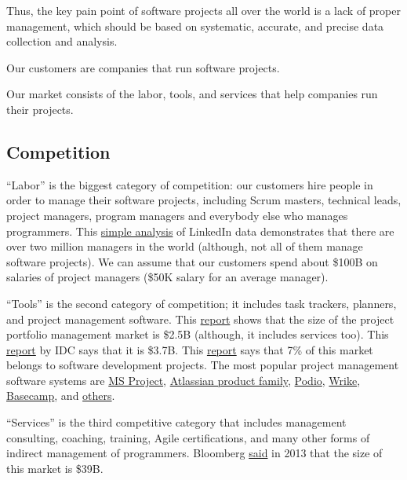 \documentclass{main}
\begin{document}
Thus, the key pain point of software projects all over the world is a lack of proper
management, which should be based on systematic, accurate, and precise data
collection and analysis.

Our customers are companies that run software projects.

Our market consists of the labor, tools, and services that help companies run
their projects.

\subsection{Competition}

``Labor'' is the biggest category of competition: our customers hire people in
order to manage their software projects, including Scrum masters, technical
leads, project managers, program managers and everybody else who manages
programmers. This \href{https://www.binfire.com/blog/2016/06/how-many-project-managers-in-the-world/}{simple analysis}
of LinkedIn data demonstrates that there are
over two million managers in the world (although, not all of them manage
software projects). We can assume that our customers spend about \$100B on
salaries of project managers (\$50K salary for an average manager).

``Tools'' is the second category of competition; it includes task trackers,
pla\-n\-ners, and project management software. This
\href{http://www.marketsandmarkets.com/Market-Reports/project-portfolio-management-software-market-225932595.html}{report}
shows that the size of
the project portfolio management market is \$2.5B (although, it includes services
too). This \href{http://www.idc.com/getdoc.jsp?containerId=256779}{report}
by IDC says that it is \$3.7B. This
\href{https://www.capterra.com/project-management-software/user-research/}{report} says that 7\% of this
market belongs to software development projects. The most popular project
management software systems are
\href{https://products.office.com/en-us/project/project-and-portfolio-management-software}{MS Project},
\href{https://www.atlassian.com/software}{Atlassian product family},
\href{https://podio.com/site/en}{Podio},
\href{https://www.wrike.com/}{Wrike},
\href{https://basecamp.com/}{Basecamp}, and
\href{https://www.capterra.com/project-management-software/#infographic}{others}.

``Services'' is the third competitive category that includes management
consulting, coaching, training, Agile certifications, and many other forms of
indirect management of programmers. Bloomberg
\href{http://www.bloomberg.com/news/articles/2013-06-13/where-the-growth-is-in-management-consulting}{said}
in 2013 that the size of this
market is \$39B.
\end{document}
